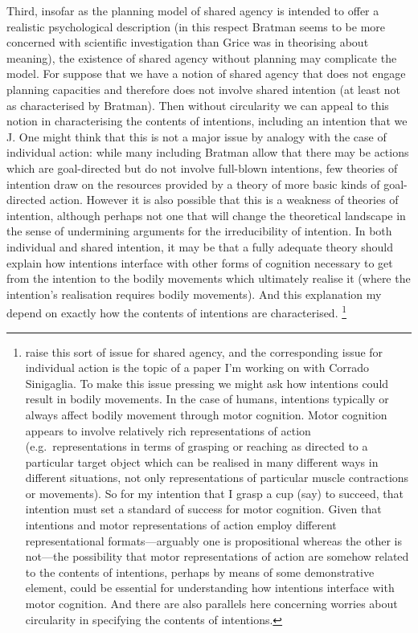 \documentclass[12pt,letterpaper]{extarticle}
\begin{document}
Third, insofar as the planning model of shared agency is intended to offer a realistic psychological description (in this respect Bratman seems to be more concerned with scientific investigation than Grice was in theorising about meaning), the existence of shared agency without planning may complicate the model.
For suppose that we have a notion of shared agency that does not engage planning capacities and therefore does not involve shared intention (at least not as characterised by Bratman).
Then without circularity we can appeal to this notion in characterising the contents of intentions, including an intention that we J.
One might think that this is not a major issue by analogy with the case of individual action: while many including Bratman allow that there may be actions which are goal-directed but do not involve  full-blown intentions, few theories of intention draw on the resources provided by a theory of more basic kinds of goal-directed action.
However it is also possible that this is a weakness of theories of intention, although perhaps not one that will change the theoretical landscape in the sense of undermining arguments for the irreducibility of intention.
In both individual and shared intention, it may be that a fully adequate theory should explain how intentions interface with other forms of cognition necessary to get from the intention to the bodily movements which ultimately realise it (where the intention's realisation requires bodily movements).
And this explanation my depend on exactly how the contents of intentions are characterised.%
\footnote{
\citet{vesper_minimal_2010} raise this sort of issue for shared agency, and the corresponding issue for individual action is the topic of a paper I'm working on with Corrado Sinigaglia.
To make this issue pressing we might ask how intentions could result in bodily movements.
In the case of humans, intentions typically or always affect bodily movement through motor cognition.
Motor cognition appears to involve relatively rich representations of action (e.g.\ representations in terms of grasping or reaching as directed to a particular target object which can be realised in many different ways in different situations,  not only representations of particular muscle contractions or movements).
So for my intention that I grasp a cup (say) to succeed, that intention must set a standard of success for motor cognition.
Given that intentions and motor representations of action employ different representational formats---arguably one is  propositional whereas the other is not---the possibility that motor representations of action are somehow related to the contents of intentions, perhaps by means of some demonstrative element, could be essential for understanding how intentions interface with motor cognition.
And there are also parallels here concerning worries about circularity in specifying the contents of intentions.
}
\end{document}
